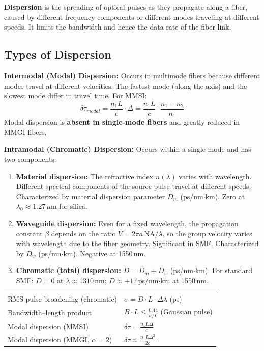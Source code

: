 \documentclass[12pt,a4paper]{article}
\renewcommand{\arraystretch}{1.45}
\begin{document}
\begin{tcolorbox}[defbox, title={\textbf{Dispersion --- Definition}}]
\textbf{Dispersion} is the spreading of optical pulses as they propagate along a fiber, caused by different frequency components or different modes traveling at different speeds. It limits the bandwidth and hence the data rate of the fiber link.
\end{tcolorbox}

\subsection{Types of Dispersion}

\textbf{Intermodal (Modal) Dispersion:}
Occurs in multimode fibers because different modes travel at different velocities. The fastest mode (along the axis) and the slowest mode differ in travel time. For MMSI:
\[
\delta\tau_{modal} = \frac{n_1 L}{c}\cdot\Delta = \frac{n_1 L}{c}\cdot\frac{n_1 - n_2}{n_1}
\]
Modal dispersion is \textbf{absent in single-mode fibers} and greatly reduced in MMGI fibers.

\textbf{Intramodal (Chromatic) Dispersion:} Occurs within a single mode and has two components:
\begin{enumerate}[leftmargin=*, itemsep=3pt, label=\textbf{\arabic*.}]
  \item \textbf{Material dispersion:} The refractive index $n(\lambda)$ varies with wavelength. Different spectral components of the source pulse travel at different speeds. Characterized by material dispersion parameter $D_m$ (ps/nm$\cdot$km). Zero at $\lambda_0 \approx 1.27\,\mu$m for silica.
  \item \textbf{Waveguide dispersion:} Even for a fixed wavelength, the propagation constant $\beta$ depends on the ratio $V = 2\pi a\,\text{NA}/\lambda$, so the group velocity varies with wavelength due to the fiber geometry. Significant in SMF. Characterized by $D_w$ (ps/nm$\cdot$km). Negative at 1550\,nm.
  \item \textbf{Chromatic (total) dispersion:} $D = D_m + D_w$ (ps/nm$\cdot$km). For standard SMF: $D = 0$ at $\lambda \approx 1310\,$nm; $D \approx +17\,$ps/nm$\cdot$km at 1550\,nm.
\end{enumerate}

\begin{tcolorbox}[formulabox, title={\textbf{Dispersion Formulas}}]
\renewcommand{\arraystretch}{1.55}
\begin{tabularx}{\linewidth}{B{4.5cm} X}
RMS pulse broadening (chromatic) & $\sigma = D \cdot L \cdot \Delta\lambda$ \quad (ps) \\[4pt]
Bandwidth--length product & $B \cdot L \leq \displaystyle\frac{0.44}{\sigma/L}$ (Gaussian pulse) \\[6pt]
Modal dispersion (MMSI) & $\delta\tau = \displaystyle\frac{n_1 L \Delta}{c}$ \\[6pt]
Modal dispersion (MMGI, $\alpha{=}2$) & $\delta\tau \approx \displaystyle\frac{n_1 L \Delta^2}{2c}$ \\[6pt]
\end{tabularx}
\end{tcolorbox}
\end{document}
